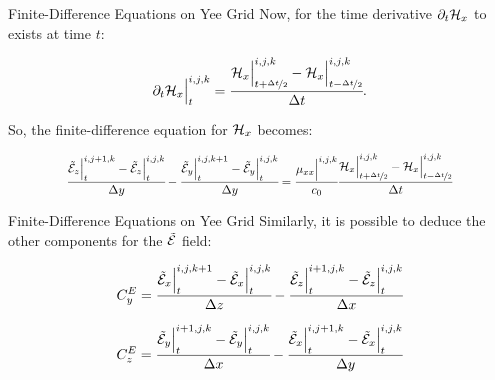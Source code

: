 \documentclass{beamer}
\begin{document}
\begin{frame}{Finite-Difference Equations on Yee Grid}
  Now, for the time derivative $\partial_t \mathcal{H}_x$ to exists at time $t$:

\begin{equation}
    \partial_t \mathcal{H}_x\Big|^{i,j,k}_t = \cfrac{\mathcal{H}_x\Big|^{i,j,k}_{t+\nicefrac{\Delta t}{2}} - \mathcal{H}_x\Big|^{i,j,k}_{t-\nicefrac{\Delta t}{2}}}{\Delta t}.
\end{equation}

So, the finite-difference equation for $\mathcal{H}_x$ becomes:

\begin{align}
  \resizebox{.8\hsize}{!}{$
    \cfrac{\En_z\Big|^{i,j+1,k}_{t}-\En_z\Big|^{i,j,k}_{t}}{\dy} - \cfrac{\En_y\Big|^{i,j,k+1}_{t}-\En_y\Big|^{i,j,k}_{t}}{\dy}
    =\cfrac{\mu_{xx}\Big|^{i,j,k}}{c_0}\cfrac{\Hht_x\Big|^{i,j,k}_{t+\nicefrac{\dt}{2}} - \Hht_x\Big|^{i,j,k}_{t-\nicefrac{\dt}{2}}}{\dt}
    \label{eq:fd_hx}
  $}
\end{align}

\end{frame}

\begin{frame}{Finite-Difference Equations on Yee Grid}
  Similarly, it is possible to deduce the other components for the $\tilde{\mathcal{E}}$ field:

      \begin{align}
        C_y^E = \cfrac{\tilde{\mathcal{E}}_x\Big|^{i,j,k+1}_{t}-\tilde{\mathcal{E}}_x\Big|^{i,j,k}_{t}}{\Delta z} - \cfrac{\tilde{\mathcal{E}}_z\Big|^{i+1,j,k}_{t}-\tilde{\mathcal{E}}_z\Big|^{i,j,k}_{t}}{\Delta x}
        \label{eq:CEy}
      \end{align}
    
      \begin{align}
            C_z^E = \cfrac{\tilde{\mathcal{E}}_y\Big|^{i+1,j,k}_{t}-\tilde{\mathcal{E}}_y\Big|^{i,j,k}_{t}}{\Delta x} - \cfrac{\tilde{\mathcal{E}}_x\Big|^{i,j+1,k}_{t}-\tilde{\mathcal{E}}_x\Big|^{i,j,k}_{t}}{\Delta y}
            \label{eq:CEz}
      \end{align}
\end{frame}
\end{document}
